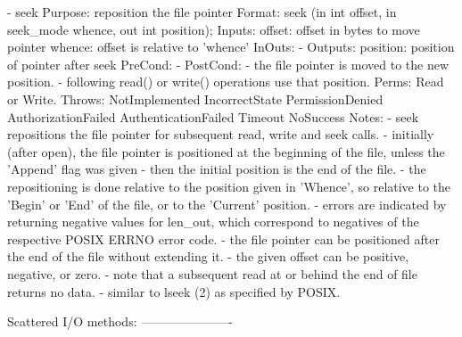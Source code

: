 \begin{myspec}
 
    - seek
      Purpose:  reposition the file pointer
      Format:   seek               (in  int        offset,
                                    in  seek_mode  whence,
                                    out int        position);
      Inputs:   offset:             offset in bytes to move
                                    pointer
                whence:             offset is relative to
                                    'whence'
      InOuts:   -
      Outputs:  position:           position of pointer after
                                    seek
      PreCond:  -
      PostCond: - the file pointer is moved to the new position.
                - following read() or write() operations use
                  that position.
      Perms:    Read or Write.
      Throws:   NotImplemented
                IncorrectState
                PermissionDenied
                AuthorizationFailed
                AuthenticationFailed
                Timeout
                NoSuccess
      Notes:    - seek repositions the file pointer for
                  subsequent read, write and seek calls.
                - initially (after open), the file pointer is
                  positioned at the beginning of the file,
                  unless the 'Append' flag was given - then
                  the initial position is the end of the file.
                - the repositioning is done relative to the
                  position given in 'Whence', so relative to
                  the 'Begin' or 'End' of the file, or to the
                  'Current' position.
                - errors are indicated by returning negative
                  values for len_out, which correspond to
                  negatives of the respective POSIX ERRNO error 
                  code.
                - the file pointer can be positioned after the
                  end of the file without extending it.  
                - the given offset can be positive, negative, or
                  zero.
                - note that a subsequent read at or behind the end 
                  of file returns no data.
                - similar to lseek (2) as specified by POSIX.
 
 
    Scattered I/O methods:
    ----------------------
 

\end{myspec}
